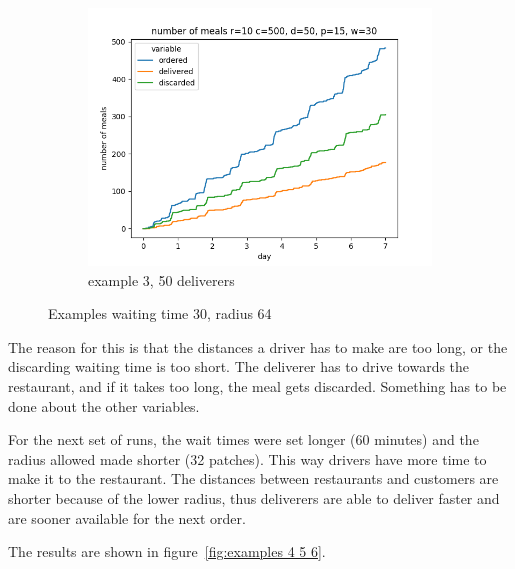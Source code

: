 \begin{center}
\begin{figure}
\begin{subfigure}[m]{0.30\textwidth}
        \end{subfigure}
        \hfill
        \begin{subfigure}[m]{0.30\textwidth}
            \centering
            \includegraphics[width=\textwidth]{sections/run1/week_ed_food_ordering_distribution_500_10_50_30}
            \caption{example 3, 50 deliverers}
        \end{subfigure}
        \caption{Examples waiting time 30, radius 64 }
        \label{fig:examples 1 2 3}
    \end{figure}
\end{center}

The reason for this is that the distances a driver has to make are too long, or the discarding waiting time is too short.
The deliverer has to drive towards the restaurant, and if it takes too long, the meal gets discarded.
Something has to be done about the other variables.

For the next set of runs, the wait times were set longer (60 minutes) and the radius allowed made shorter (32 patches).
This way drivers have more time to make it to the restaurant.
The distances between restaurants and customers are shorter because of the lower radius, thus deliverers are able to deliver faster and are sooner available for the next order.

The results are shown in figure~\ref{fig:examples 4 5 6}.

